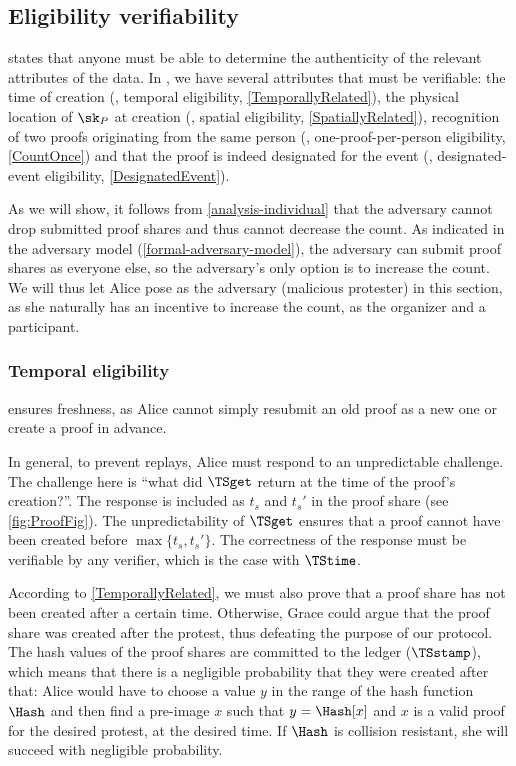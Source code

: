 
\subsection{Eligibility verifiability}%
\label{analysis-eligibility}

 states that anyone must be able to determine the authenticity of the relevant attributes of the data.
In \CROCUS, we have several attributes that must be verifiable: the time of 
creation (\ie, temporal eligibility, \cref{TemporallyRelated}), the physical 
location of \(\sk_P\) at creation (\ie, spatial eligibility, 
\cref{SpatiallyRelated}), recognition of two proofs originating from the same 
person (\ie, one-proof-per-person eligibility, \cref{CountOnce}) and that the 
proof is indeed designated for the event (\ie, designated-event eligibility, 
\cref{DesignatedEvent}).

As we will show, it follows from \cref{analysis-individual} that the adversary 
cannot drop submitted proof shares and thus cannot decrease the count.
As indicated in the adversary model (\cref{formal-adversary-model}), the 
adversary can submit proof shares as everyone else, so the adversary's only 
option is to increase the count.
We will thus let Alice pose as the adversary (malicious protester) in this 
section, as she naturally has an incentive to increase the count, as the 
organizer and a participant.

\subsubsection{Temporal eligibility}%
\label{analysis-temporal}

 ensures freshness, as Alice cannot simply resubmit an 
old proof as a new one or create a proof in advance.

In general, to prevent replays, Alice must respond to an unpredictable 
challenge.
The challenge here is \enquote{what did \(\TSget\) return at the time of the 
  proof's creation?}.
The response is included as \(t_s\) and \(t_s'\) in the proof share (see 
\cref{fig:ProofFig}).
The unpredictability of \(\TSget\) ensures that a proof cannot have been 
created before \(\max\{t_s, t_s'\}\).
The correctness of the response must be verifiable by any verifier, which is 
the case with \(\TStime\).

According to \cref{TemporallyRelated}, we must also prove that a proof share has not been created after a certain time.
Otherwise, Grace could argue that the proof share was created after the protest, thus defeating the purpose of our protocol.
The hash values of the proof shares are committed to the ledger (\(\TSstamp\)), 
which means that there is a negligible probability that they were created after 
that:
Alice would have to choose a value \(y\) in the range of the hash function 
\(\Hash\) and then find a pre-image \(x\) such that \(y = \Hash[x]\) and \(x\) 
is a valid proof for the desired protest, at the desired time.
If \(\Hash\) is collision resistant, she will succeed with negligible 
probability.

